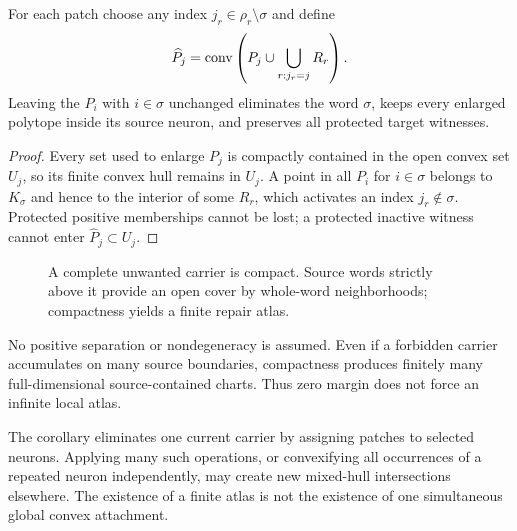 \begin{corollary}
For each patch choose any index $j_r\in\rho_r\setminus\sigma$ and define
\[
 \widehat P_j
 =\operatorname{conv}\left(P_j\cup\bigcup_{r:j_r=j}R_r\right).
\]
Leaving the $P_i$ with $i\in\sigma$ unchanged eliminates the word $\sigma$, keeps every enlarged polytope inside its source neuron, and preserves all protected target witnesses.
\end{corollary}

\begin{proof}
Every set used to enlarge $P_j$ is compactly contained in the open convex set $U_j$, so its finite convex hull remains in $U_j$.  A point in all $P_i$ for $i\in\sigma$ belongs to $K_\sigma$ and hence to the interior of some $R_r$, which activates an index $j_r\notin\sigma$.  Protected positive memberships cannot be lost; a protected inactive witness cannot enter $\widehat P_j\subset U_j$.
\end{proof}

\begin{figure}[t]
\centering

\caption{A complete unwanted carrier is compact.  Source words strictly above it provide an open cover by whole-word neighborhoods; compactness yields a finite repair atlas.}
\label{fig:repair-atlas}
\end{figure}

\begin{remark}
No positive separation or nondegeneracy is assumed.  Even if a forbidden carrier accumulates on many source boundaries, compactness produces finitely many full-dimensional source-contained charts.  Thus zero margin does not force an infinite local atlas.
\end{remark}

\begin{remark}
The corollary eliminates one current carrier by assigning patches to selected neurons.  Applying many such operations, or convexifying all occurrences of a repeated neuron independently, may create new mixed-hull intersections elsewhere.  The existence of a finite atlas is not the existence of one simultaneous global convex attachment.
\end{remark}
